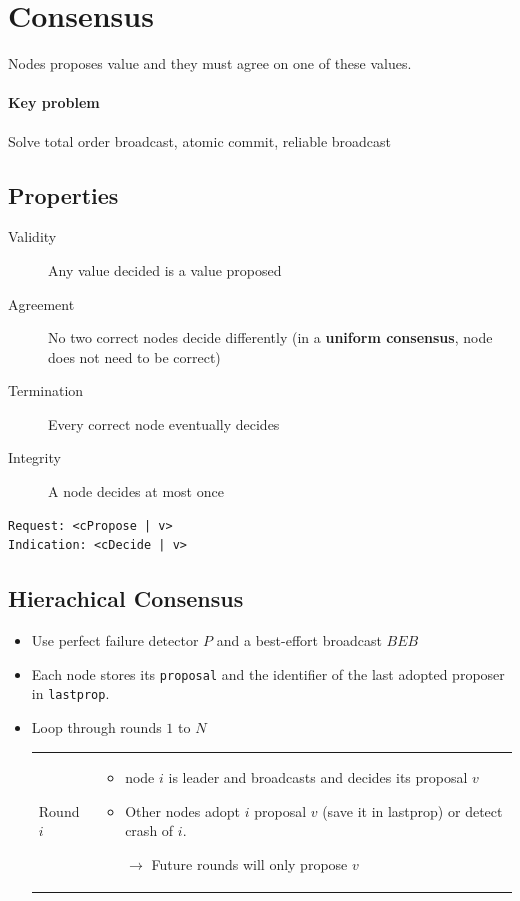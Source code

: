 \section{Consensus}

Nodes proposes value and they must agree on one of these values.

\paragraph{Key problem} Solve total order broadcast, atomic commit, reliable broadcast

\subsection{Properties}

\begin{description}
	\item[Validity] Any value decided is a value proposed
	\item[Agreement] No two correct nodes decide differently
	(in a \textbf{uniform consensus}, node does not need to be correct)
	\item[Termination] Every correct node eventually decides
	\item[Integrity] A node decides at most once
\end{description}

\begin{lstlisting}[caption={Consensus interface}]
Request: <cPropose | v>
Indication: <cDecide | v>
\end{lstlisting}


\subsection{Hierachical Consensus}

\begin{itemize}
    \item Use perfect failure detector $P$ and a best-effort broadcast $BEB$
    \item Each node stores its \texttt{proposal} and the identifier of the last
    adopted proposer in \texttt{lastprop}.
    \item Loop through rounds $1$ to $N$
        \begin{tabular}{m{1.3cm}m{13cm}}
            Round $i$ &
        \begin{itemize}
            \item node $i$ is leader and broadcasts and decides its proposal $v$
            \item Other nodes adopt $i$ proposal $v$ (save it in lastprop) or
                detect crash of $i$.
            \item[$\to$] Future rounds will only propose $v$
        \end{itemize}
    \end{tabular}
\end{itemize}

